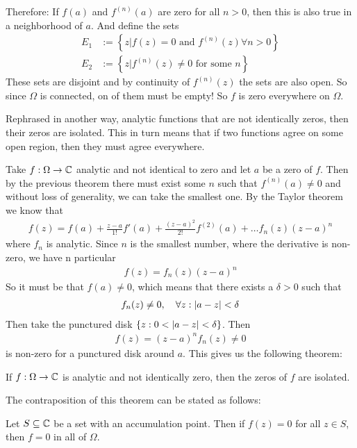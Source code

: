 Therefore: If $f(a)$ and $f^{(n)}(a)$ are zero for all $n >0$, then this is also true in a neighborhood of $a$. And define the sets
\begin{align*}
	E_1 &:= \left\{z \big\vert f(z) = 0 \text{ and } f^{(n)}(z) \forall n > 0\right\}\\
	E_2 &:= \left\{z \big\vert f^{(n)}(z) \neq 0 \text{ for some }n\right\}
\end{align*}
These sets are disjoint and by continuity of $f^{(n)}(z)$ the sets are also open. So since $\Omega$ is connected, on of them must be empty! So $f$ is zero everywhere on $\Omega$.



Rephrased in another way, analytic functions that are not identically zeros, then their zeros are isolated. This in turn means that if two functions agree on some open region, then they must agree everywhere.



Take $f: \Omega \to \mathbb{C}$ analytic and not identical to zero and let $a$ be a zero of $f$. Then by the previous theorem there must exist some $n$ such that $f^{(n)}(a) \neq 0$ and without loss of generality, we can take the smallest one.
By the Taylor theorem we know that
\begin{align*}
	f(z) = f(a) + \frac{z-a}{1!}f'(a) + \frac{(z-a)^2}{2!}f^{(2)}(a) + \ldots f_n(z)(z- a)^{n}
\end{align*}
where $f_n$ is analytic. Since $n$ is the smallest number, where the derivative is non-zero, we have n particular
\begin{align*}
	f(z) = f_n(z) (z-a)^{n}
\end{align*}
So it must be that $f(a) \neq 0$, which means that there exists a $\delta > 0$ such that 
\begin{align*}
	f_n(z) \neq 0, \quad \forall z: \vert a-z\vert < \delta
\end{align*}
Then take the punctured disk $\left\{z: 0 < \vert a-z\vert < \delta\right\}$. Then
\begin{align*}
	f(z) = (z-a)^{n}f_n(z) \neq 0
\end{align*}
is non-zero for a punctured disk around $a$. This gives us the following theorem:
\begin{theorem}[]
If $f: \Omega \to \mathbb{C}$ is analytic and not identically zero, then the zeros of $f$ are isolated.
\end{theorem}
The contraposition of this theorem can be stated as follows:

Let $S \subseteq \mathbb{C}$ be a set with an accumulation point. Then if $f(z) = 0$ for all $z \in S$, then $f = 0$ in all of $\Omega$.


